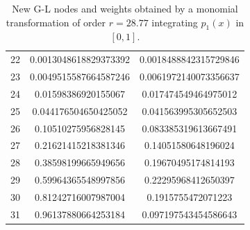 \documentclass[a4paper, twosided]{book}
\begin{document}
\begin{table}[H]
\begin{tabular}{|c||c|c|}
22  &  0.0013048618829373392   &  0.0018488842315729846   \\
23  &  0.0049515587664587246   &  0.0061972140073356637   \\
24  &  0.01598386920155067     &  0.017474549464975012    \\
25  &  0.044176504650425052    &  0.041563995305652503    \\
26  &  0.10510275956828145     &  0.083385319613667491    \\
27  &  0.21621415218381346     &  0.14051580648196024     \\
28  &  0.38598199665949656     &  0.19670495174814193     \\
29  &  0.59964365548997856     &  0.22295968412650397     \\
30  &  0.81242716007987004     &  0.1915755472071223      \\
31  &  0.96137880664253184     &  0.097197543454586643    \\
\hline
\end{tabular}
  \caption{New G-L nodes and weights obtained by a monomial transformation of order $r=28.77$ integrating $p_1(x)$ in $[0,1]$.}
  \label{table2.1}
\end{table}
\end{document}
